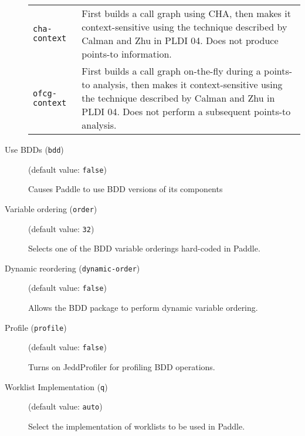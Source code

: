 \documentclass{article}
\begin{document}
\begin{description}
\begin{longtable}{p{1in}p{4in}}
{\tt cha-context }
&

First builds a call graph using CHA, then makes it context-sensitive using
the technique described by Calman and Zhu in PLDI 04. Does not produce
points-to information.
\\

{\tt ofcg-context }
&

First builds a call graph on-the-fly during a points-to analysis, then
makes it context-sensitive using the technique described by Calman and
Zhu in PLDI 04. Does not perform a subsequent points-to analysis.
\\

\end{longtable}


\item[Use BDDs ({\tt bdd})]
(default value: {\tt false})




                                                        Causes Paddle to use BDD versions of its components
        


\item[Variable ordering ({\tt order})]
(default value: {\tt 32})




                                        Selects one of the BDD variable orderings hard-coded in Paddle.
                


\item[Dynamic reordering ({\tt dynamic-order})]
(default value: {\tt false})




                                        Allows the BDD package to perform dynamic variable ordering.
                


\item[Profile ({\tt profile})]
(default value: {\tt false})




Turns on JeddProfiler for profiling BDD operations.
        


\item[Worklist Implementation ({\tt q})]
(default value: {\tt auto})




Select the implementation of worklists to be used in Paddle.
        




\end{description}
\end{document}
